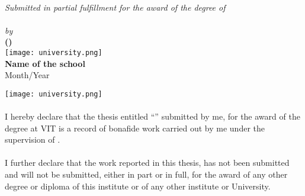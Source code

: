 \begin{titlepage}
    \begin{center}
        \vspace*{0.6in}
        \textbf{\LARGE{\projecttitle}}\\
        \vspace{0.6in}
        \textit{\large{Submitted in partial fulfillment for the award of the degree of}}\\
        \vspace{0.6in}
        \textbf{\Large{\degreename}}\\
        \vspace{0.9in}
        \textit{\large{by}}\\
        \vspace{0.6in}
        \uppercase{\textbf{\Large{\authorname (\regnum)}}}\\
        \vfill
        \texttt{[image: university.png]}\\
        \vspace{0.6in}
        \textbf{\large{Name of the school}}\\
        \vspace{0.3in}
        \normalsize{Month/Year}
    \end{center}
\end{titlepage}

\begin{center}
    \vspace*{0.6in}
    \texttt{[image: university.png]}\\
    \vspace{0.6in}
    \vspace{0.3in}
\end{center}
\paragraph{}
I hereby declare that the thesis entitled “\projecttitle” submitted by me, for the award of the degree \degreename at
VIT is a record of bonafide work carried out by me under the supervision of \guidename.

\paragraph{}
I further declare that the work reported in this thesis, has not been submitted and will not be submitted,
either in part or in full, for the award of any other degree or diploma of this institute or of any other institute or University.

